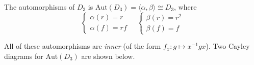 \begin{example}
    The automorphisms of $D_3$ is $\text{Aut}(D_3) = \langle \alpha, \beta \rangle \cong D_3$, where 
    \[
        \begin{cases}
            \alpha(r) = r\\
            \alpha(f) = rf 
        \end{cases}
        \quad         
        \begin{cases}
            \beta(r) = r^2\\
            \beta(f) = f 
        \end{cases}
    \]

    All of these automorphisms are \textit{inner} (of the form $f_x : g \mapsto x^{-1}gx$). Two Cayley diagrams for $\text{Aut}(D_3)$
    are shown below.

    \vspace{-4mm}
  

\end{example}
